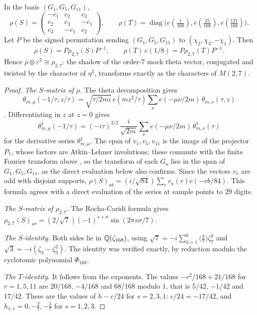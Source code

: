 \begin{theorem}\label{thm:m27}
In the basis $(G_1,G_5,G_{11})$,
\[
\rho(S)=\begin{pmatrix}-c_1&c_2&c_3\\ c_2&c_3&-c_1\\ c_3&-c_1&c_2\end{pmatrix},\qquad \rho(T)=\operatorname{diag}\bigl(e(\tfrac1{168}),e(\tfrac{25}{168}),e(\tfrac{121}{168})\bigr).
\]
Let $P$ be the signed permutation sending $(G_1,G_5,G_{11})$ to $(\chi_2,\chi_3,-\chi_1)$. Then
\[
\overline{\rho(S)}=P\rho_{2,7}(S)P^{-1},\qquad \overline{\rho(T)}\,e(1/8)=P\rho_{2,7}(T)P^{-1}.
\]
Hence $\bar\rho\otimes\varepsilon^3\cong\rho_{2,7}$: the shadow of the order-$7$ mock theta vector, conjugated and twisted by the character of $\eta^3$, transforms exactly as the characters of $M(2,7)$.
\end{theorem}
\begin{proof}
\emph{The $S$-matrix of $\rho$.} The theta decomposition gives
\[
\theta_{m,\mu}(-1/\tau,z/\tau)=\sqrt{\tau/2mi}\,e(mz^2/\tau)\sum_\nu e(-\mu\nu/2m)\,\theta_{m,\nu}(\tau,z)
\]
\cite[§5]{EichlerZagier}. Differentiating in $z$ at $z=0$ gives
\[
\theta^1_{m,\mu}(-1/\tau)=(-i\tau)^{3/2}\,\frac i{\sqrt{2m}}\sum_\nu e(-\mu\nu/2m)\,\theta^1_{m,\nu}(\tau)
\]
for the derivative series $\theta^1_{m,\mu}$. The span of $v_1,v_5,v_{11}$ is the image of the projector $P_7$, whose factors are Atkin--Lehner involutions; these commute with the finite Fourier transform above \cite{EichlerZagier,CDH}, so the transform of each $G_a$ lies in the span of $G_1,G_5,G_{11}$, as the direct evaluation below also confirms. Since the vectors $v_r$ are odd with disjoint supports, $\rho(S)_{ab}=(i/\sqrt{84})\sum_rv_a(r)e(-rb/84)$. This formula agrees with a direct evaluation of the series at sample points to $29$ digits.

\emph{The $S$-matrix of $\rho_{2,7}$.} The Rocha-Caridi formula gives $\rho_{2,7}(S)_{s\sigma}=(2/\sqrt7)(-1)^{s+\sigma}\sin(2\pi s\sigma/7)$.

\emph{The $S$-identity.} Both sides lie in $\mathbb{Q}(\zeta_{168})$, using $\sqrt7=-i\sum_{k=1}^6\bigl(\tfrac k7\bigr)\zeta_7^k$ and $\sqrt3=-i(\zeta_3-\zeta_3^2)$. The identity was verified exactly, by reduction modulo the cyclotomic polynomial $\Phi_{168}$.

\emph{The $T$-identity.} It follows from the exponents. The values $-r^2/168+21/168$ for $r=1,5,11$ are $20/168$, $-4/168$ and $68/168$ modulo $1$, that is $5/42$, $-1/42$ and $17/42$. These are the values of $h-c/24$ for $s=2,3,1$: $c/24=-17/42$, and $h_{1,s}=0,-\tfrac27,-\tfrac37$ for $s=1,2,3$.
\end{proof}

